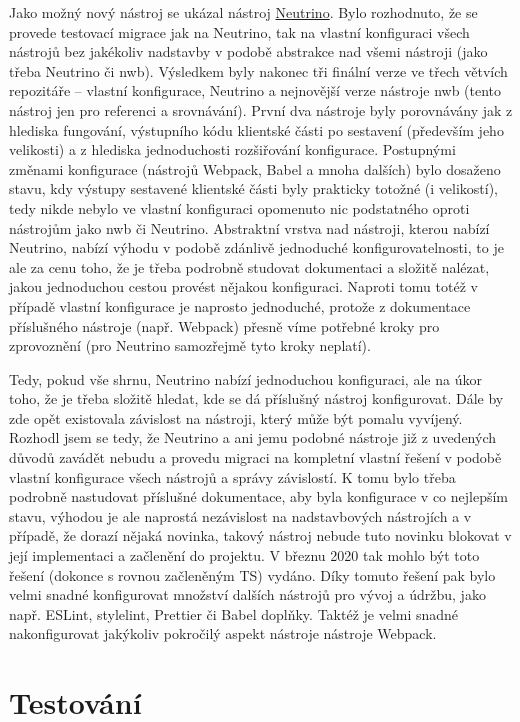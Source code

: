 Jako možný nový nástroj se ukázal nástroj \href{https://github.com/neutrinojs/neutrino/}{Neutrino}. Bylo rozhodnuto, že se provede testovací migrace jak na Neutrino, tak na vlastní konfiguraci všech nástrojů bez jakékoliv nadstavby v podobě abstrakce nad všemi nástroji (jako třeba Neutrino či nwb). Výsledkem byly nakonec tři finální verze ve třech větvích repozitáře -- vlastní konfigurace, Neutrino a nejnovější verze nástroje nwb (tento nástroj jen pro referenci a srovnávání). První dva nástroje byly porovnávány jak z hlediska fungování, výstupního kódu klientské části po sestavení (především jeho velikosti) a z hlediska jednoduchosti rozšiřování konfigurace. Postupnými změnami konfigurace (nástrojů Webpack, Babel a mnoha dalších) bylo dosaženo stavu, kdy výstupy sestavené klientské části byly prakticky totožné (i velikostí), tedy nikde nebylo ve vlastní konfiguraci opomenuto nic podstatného oproti nástrojům jako nwb či Neutrino. Abstraktní vrstva nad nástroji, kterou nabízí Neutrino, nabízí výhodu v podobě zdánlivě jednoduché konfigurovatelnosti, to je ale za cenu toho, že je třeba podrobně studovat dokumentaci a složitě nalézat, jakou jednoduchou cestou provést nějakou konfiguraci. Naproti tomu totéž v případě vlastní konfigurace je naprosto jednoduché, protože z dokumentace příslušného nástroje (např. Webpack) přesně víme potřebné kroky pro zprovoznění (pro Neutrino samozřejmě tyto kroky neplatí).

Tedy, pokud vše shrnu, Neutrino nabízí jednoduchou konfiguraci, ale na úkor toho, že je třeba složitě hledat, kde se dá příslušný nástroj konfigurovat. Dále by zde opět existovala závislost na nástroji, který může být pomalu vyvíjený. Rozhodl jsem se tedy, že Neutrino a ani jemu podobné nástroje již z uvedených důvodů zavádět nebudu a provedu migraci na kompletní vlastní řešení v podobě vlastní konfigurace všech nástrojů a správy závislostí. K tomu bylo třeba podrobně nastudovat příslušné dokumentace, aby byla konfigurace v co nejlepším stavu, výhodou je ale naprostá nezávislost na nadstavbových nástrojích a v případě, že dorazí nějaká novinka, takový nástroj nebude tuto novinku blokovat v její implementaci a začlenění do projektu. V březnu 2020 tak mohlo být toto řešení (dokonce s rovnou začleněným TS) vydáno. Díky tomuto řešení pak bylo velmi snadné konfigurovat množství dalších nástrojů pro vývoj a údržbu, jako např. ESLint, stylelint, Prettier či Babel doplňky. Taktéž je velmi snadné nakonfigurovat jakýkoliv pokročilý aspekt nástroje nástroje Webpack.

\chapter{Testování}\label{chap:testovani}

